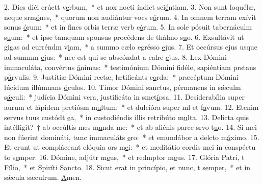 2. Dies diéi erúctt v\uline{e}rbum,~* et nox nocti índict sci\uline{é}ntiam.
3. Non sunt loquélæ, neque srm\uline{ó}nes,~* quorum non audiántur vocs e\uline{ó}rum.
4. In omnem terram exívit sonus \uline{ó}rum:~* et in fines orbis terræ verb e\uline{ó}rum.
5. In sole pósuit tabernáculm s\uline{u}um:~* et ipse tamquam sponsus procédens de thálmo s\uline{u}o.
6. Exsultávit ut gigas ad curréndm v\uline{i}am,~* a summo cælo egrésso \uline{e}jus.
7. Et occúrsus ejus usque ad summm \uline{e}jus:~* nec est qui se abscóndat a calre \uline{e}jus.
8. Lex Dómini immaculáta, convértns \uline{á}nimas:~* testimónium Dómini fidéle, sapiéntiam prstans p\uline{á}rvulis.
9. Justítiæ Dómini rectæ, lætificánts c\uline{o}rda:~* præcéptum Dómini lúcidum illúmnans \uline{ó}culos.
10. Timor Dómini sanctus, pérmanens in sǽculm s\uline{ǽ}culi:~* judícia Dómini vera, justificáta in smet\uline{í}psa.
11. Desiderabília super aurum et lápidem pretiósm m\uline{u}ltum:~* et dulcióra super ml et f\uline{a}vum.
12. Etenim servus tuus custódt \uline{e}a,~* in custodiéndis illis retribúto m\uline{u}lta.
13. Delícta quis intélligit?~† ab occúltis mes m\uline{u}nda me:~* et ab aliénis parce srvo t\uline{u}o.
14. Si mei non fúerint domináti, tunc immaculáts \uline{e}ro:~* et emundábor a delcto m\uline{á}ximo.
15. Et erunt ut compláceant elóquia ors m\uline{e}i:~* et meditátio cordis mei in conspéctu to s\uline{e}mper.
16. Dómine, adjútr m\uline{e}us,~* et redmptor m\uline{e}us.
17. Glória Patri, t F\uline{í}lio,~* et Spiríti S\uline{a}ncto.
18. Sicut erat in princípio, et nunc, t s\uline{e}mper,~* et in sǽcula sæculrum. \uline{A}men.
